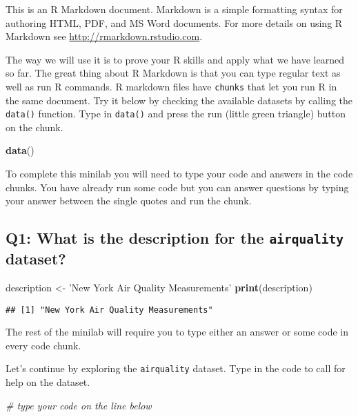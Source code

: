 \documentclass[]{book}
\newenvironment{Shaded}{\begin{snugshade}}{\end{snugshade}}
\newcommand{\KeywordTok}[1]{\textcolor[rgb]{0.13,0.29,0.53}{\textbf{#1}}}
\newcommand{\StringTok}[1]{\textcolor[rgb]{0.31,0.60,0.02}{#1}}
\newcommand{\CommentTok}[1]{\textcolor[rgb]{0.56,0.35,0.01}{\textit{#1}}}
\newcommand{\NormalTok}[1]{#1}
\begin{document}
This is an R Markdown document. Markdown is a simple formatting syntax
for authoring HTML, PDF, and MS Word documents. For more details on
using R Markdown see \url{http://rmarkdown.rstudio.com}.

The way we will use it is to prove your R skills and apply what we have
learned so far. The great thing about R Markdown is that you can type
regular text as well as run R commands. R markdown files have
\texttt{chunks} that let you run R in the same document. Try it below by
checking the available datasets by calling the \texttt{data()} function.
Type in \texttt{data()} and press the run (little green triangle) button
on the chunk.

\begin{Shaded}
\begin{Highlighting}[]
\KeywordTok{data}\NormalTok{()}
\end{Highlighting}
\end{Shaded}

To complete this minilab you will need to type your code and answers in
the code chunks. You have already run some code but you can answer
questions by typing your answer between the single quotes and run the
chunk.

\subsection{\texorpdfstring{Q1: What is the description for the
\texttt{airquality}
dataset?}{Q1: What is the description for the airquality dataset?}}\label{q1-what-is-the-description-for-the-airquality-dataset}

\begin{Shaded}
\begin{Highlighting}[]
\NormalTok{description <-}\StringTok{ 'New York Air Quality Measurements'}
\KeywordTok{print}\NormalTok{(description)}
\end{Highlighting}
\end{Shaded}

\begin{verbatim}
## [1] "New York Air Quality Measurements"
\end{verbatim}

The rest of the minilab will require you to type either an answer or
some code in every code chunk.

Let's continue by exploring the \texttt{airquality} dataset. Type in the
code to call for help on the dataset.

\begin{Shaded}
\begin{Highlighting}[]
\CommentTok{# type your code on the line below}
\end{Highlighting}
\end{Shaded}
\end{document}
